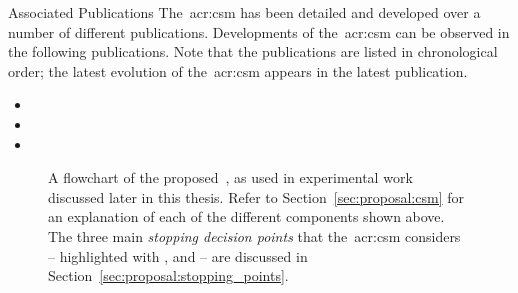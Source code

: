 \vspace*{5mm}
\begin{publications_box}{Associated Publications}
The~\gls{acr:csm} has been detailed and developed over a number of different publications. Developments of the~\gls{acr:csm} can be observed in the following publications. Note that the publications are listed in chronological order; the latest evolution of the~\gls{acr:csm} appears in the latest publication.
\begin{itemize}
    \item{}
    \item{}
    \item{}
\end{itemize}
\end{publications_box}
\begin{figure}[t!]
    \centering
    \caption[The Complex Searcher Model]{A flowchart of the proposed~, as used in experimental work discussed later in this thesis. Refer to Section~\ref{sec:proposal:csm} for an explanation of each of the different components shown above. The three main \emph{stopping decision points} that the~\gls{acr:csm} considers – highlighted with ,  and  – are discussed in Section~\ref{sec:proposal:stopping_points}.}
    \label{fig:csm}
\end{figure}

